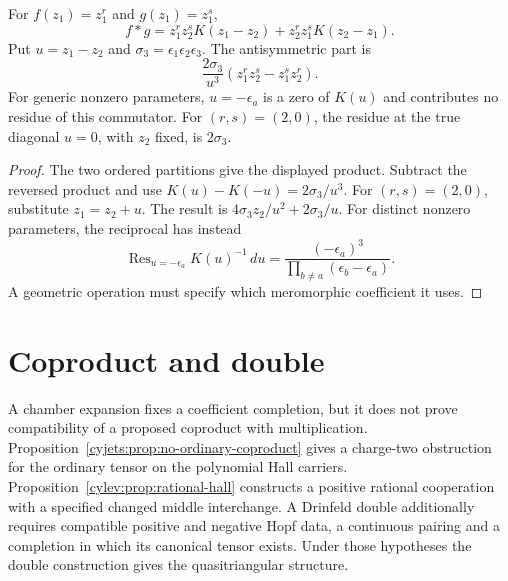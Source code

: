 \begin{calculation}
For $f(z_1)=z_1^r$ and $g(z_1)=z_1^s$,
\[
 f*g
 =z_1^rz_2^sK(z_1-z_2)+z_2^rz_1^sK(z_2-z_1).
\]
Put $u=z_1-z_2$ and $\sigma_3=\epsilon_1\epsilon_2\epsilon_3$.
The antisymmetric part is
\[
 \frac{2\sigma_3}{u^3}
 (z_1^rz_2^s-z_1^sz_2^r).
\]
For generic nonzero parameters, $u=-\epsilon_a$ is a zero of
$K(u)$ and contributes no residue of this commutator.
For $(r,s)=(2,0)$, the residue at the true diagonal $u=0$,
with $z_2$ fixed, is $2\sigma_3$.
\end{calculation}
\begin{proof}
The two ordered partitions give the displayed product.
Subtract the reversed product and use
$K(u)-K(-u)=2\sigma_3/u^3$.
For $(r,s)=(2,0)$, substitute $z_1=z_2+u$.
The result is $4\sigma_3z_2/u^2+2\sigma_3/u$.
For distinct nonzero parameters, the reciprocal has instead
\[
 \operatorname{Res}_{u=-\epsilon_a}K(u)^{-1}\,du
       =\frac{(-\epsilon_a)^3}
                    {\prod_{b\ne a}(\epsilon_b-\epsilon_a)}.
\]
A geometric operation must specify which meromorphic coefficient it uses.
\end{proof}

\section{Coproduct and double}
A chamber expansion fixes a coefficient completion, but it does not
prove compatibility of a proposed coproduct with multiplication.
Proposition~\ref{cyjets:prop:no-ordinary-coproduct} gives a charge-two
obstruction for the ordinary tensor on the polynomial Hall carriers.
Proposition~\ref{cylev:prop:rational-hall} constructs a positive
rational cooperation with a specified changed middle interchange.
A Drinfeld double additionally requires compatible positive and negative
Hopf data, a continuous pairing and a completion in which its canonical
tensor exists. Under those hypotheses the double construction gives
the quasitriangular structure.

